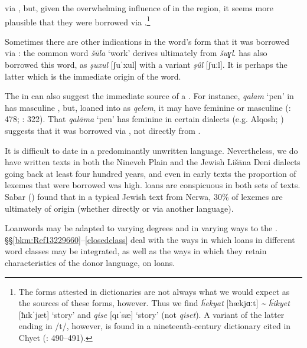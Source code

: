 \documentclass[output=paper]{langsci/langscibook}
\begin{document}
via , but, given the overwhelming influence of  in the region, it seems more plausible that they were borrowed via .\footnote{The  forms attested in dictionaries are not always what we would expect as the sources of these forms, however. Thus we find \textit{ḧekyat} [ħækjɑːt] \textit{{\textasciitilde} ḧikyet} [ħɪk\textrm{ˈ}jæt] ‘story’  and \textit{qise} [qɪ\textrm{ˈ}sæ] ‘story’ (not \textit{qiset}). A variant of the latter ending in /t/, however, is found in a nineteenth-century dictionary cited in Chyet (\citeyear{Chyet2003}: 490–491).}

Sometimes there are other indications in the word’s form that it was borrowed via : the common  word \textit{šūla} ‘work’ derives ultimately from  \textit{šuɣl}.   has also borrowed this word, as \textit{şuxul} [ʃuˈxul] with a variant \textit{şûl} [ʃuːl]. It is perhaps the latter which is the immediate origin of the  word.

The  in  can also suggest the immediate source of a . For instance, \textit{qalam} ‘pen’ in  has masculine , but, loaned into   as \textit{qelem}, it may have feminine or masculine  (\citealt{Chyet2003}: 478; \citealt{Rizgar1993}: 322). That \textit{qalāma} ‘pen’ has feminine  in certain  dialects (e.g. Alqosh; \citealt[199]{Coghill2004}) suggests that it was borrowed via , not directly from .

It is difficult to date  in a predominantly unwritten language. Nevertheless, we do have written texts in both the  Nineveh Plain and the Jewish Lišāna Deni dialects going back at least four hundred years, and even in early texts the proportion of lexemes that were borrowed was high.  loans are conspicuous in both sets of texts. Sabar (\citeyear[208]{Sabar1984}) found that in a typical Jewish text from Nerwa, 30\% of lexemes are ultimately of  origin (whether directly or via another language).

Loanwords may be adapted to varying degrees and in varying ways to the . §§\ref{bkm:Ref13229660}–\ref{closedclass} deal with the ways in which loans in different word classes may be integrated, as well as the ways in which they retain characteristics of the donor language,  on  loans.
\end{document}
